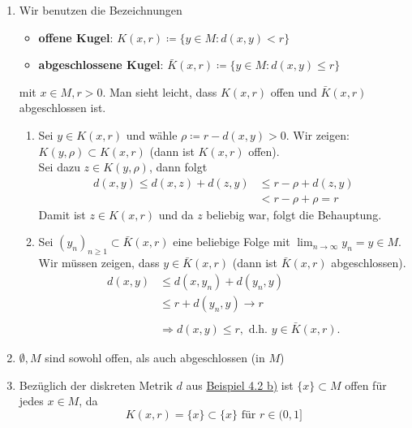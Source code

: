 \begin{bemerkung} \label{bem:4.5}
	\begin{enumerate}[label=\alph*\upshape)] 
		\item Wir benutzen die Bezeichnungen
			\begin{itemize}
				\item \textbf{offene Kugel}: $K(x, r)  \coloneqq \{ y \in M: d(x, y) < r \}$
				\item \textbf{abgeschlossene Kugel}: $\bar K(x, r) \coloneqq \{ y \in M: d(x, y) \leq r \}$
			\end{itemize}
			mit $x \in M, r > 0$. Man sieht leicht, dass $K(x, r)$ offen und $\bar K(x, r)$ abgeschlossen ist.
		\begin{beweis}
			\begin{enumerate}
			\item Sei $y \in K(x, r)$ und wähle $\rho \coloneqq r - d(x, y) > 0$. Wir zeigen: $K(y, \rho) \subset K(x, r)$ (dann ist $K(x, r)$ offen). \\ 
				Sei dazu $z \in K(y, \rho)$, dann folgt 
				\begin{align*}
					d(x, y) \leq d(x, z) + d(z,y) & \leq r - \rho + d(z, y) \\
												  & < r - \rho + \rho = r
				\end{align*} 
				Damit ist $z \in K(x, r)$ und da $z$ beliebig war, folgt die Behauptung.
			\item Sei $(y_{n})_{n \geq 1} \subset \bar K(x, r)$ eine beliebige Folge mit $ \lim_{n \rightarrow \infty} y_{n} = y \in M$. Wir müssen zeigen, dass $y \in \bar K(x, r)$ (dann ist $\bar K(x, r)$ abgeschlossen).
				\begin{align*}
					d(x, y) & \leq d(x, y_{n}) + d(y_{n}, y) \\
							& \leq r + d(y_{n}, y) \rightarrow r \\ \\
						& \Rightarrow d(x, y) \leq r, \text{ d.h. } y \in \bar K(x, r).
				\end{align*} 
			\end{enumerate}	
		\end{beweis} 
		\item $\emptyset, M$ sind sowohl offen, als auch abgeschlossen (in $M$)
		\item Bezüglich der diskreten Metrik $d$ aus \hyperref[bsp:1-diskreteMetrik]{Beispiel 4.2 b)} ist $\{x\} \subset M$ offen für jedes $x \in M$, da
			\[ K(x, r) = \{ x \} \subset \{ x \} \text{ für } r \in (0, 1] \]
	\end{enumerate}	
\end{bemerkung}


